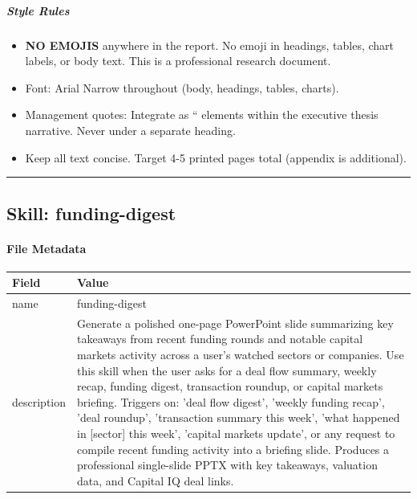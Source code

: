 \documentclass[11pt]{article}
\begin{document}
\subparagraph{Style Rules}\mbox{}\par
\begin{itemize}[leftmargin=*,itemsep=2pt,topsep=2pt]
\item {} \textbf{NO EMOJIS} anywhere in the report. No emoji in headings, tables, chart labels, or body text. This is a professional research document.
\item {} Font: Arial Narrow throughout (body, headings, tables, charts).
\item {} Management quotes: Integrate as `` elements within the executive thesis narrative. Never under a separate heading.
\item {} Keep all text concise. Target 4-5 printed pages total (appendix is additional).
\end{itemize}

\vspace{0.8em}\hrule\vspace{0.8em}

\subsection{Skill: funding-digest}\label{file:spglobal-skills-funding-digest-SKILL.md}

\paragraph{File Metadata}\mbox{}\par
\begingroup
\small
\setlength{\tabcolsep}{2pt}
\begin{longtable}{>{\RaggedRight\arraybackslash\hspace{0pt}}p{}>{\RaggedRight\arraybackslash\hspace{0pt}}p{}}
\toprule
{} \textbf{Field} & \textbf{Value} \\
\midrule
{} name & funding-digest \\
{} description & Generate a polished one-page PowerPoint slide summarizing key takeaways from recent funding rounds and notable capital markets activity across a user's watched sectors or companies. Use this skill when the user asks for a deal flow summary, weekly recap, funding digest, transaction roundup, or capital markets briefing. Triggers on: 'deal flow digest', 'weekly funding recap', 'deal roundup', 'transaction summary this week', 'what happened in [sector] this week', 'capital markets update', or any request to compile recent funding activity into a briefing slide. Produces a professional single-slide PPTX with key takeaways, valuation data, and Capital IQ deal links. \\
\bottomrule
\end{longtable}
\endgroup
\end{document}
